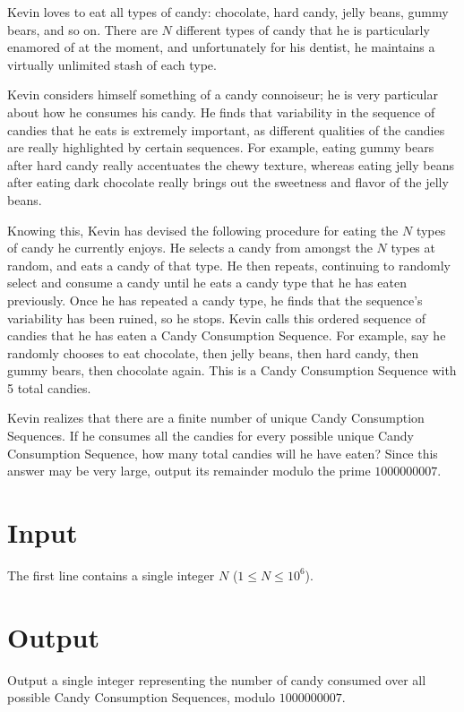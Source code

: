 
Kevin loves to eat all types of candy: chocolate, hard candy, jelly beans, gummy bears, and so on.
There are $N$ different types of candy that he is particularly enamored of at the moment, and unfortunately
for his dentist, he maintains a virtually unlimited stash of each type.

Kevin considers himself something of a candy connoiseur; he is very particular about how he consumes his
candy. He finds that variability in the sequence of candies that he eats is extremely important, as
different qualities of the candies are really highlighted by certain sequences. For example, eating gummy
bears after hard candy really accentuates the chewy texture, whereas eating jelly beans after eating dark
chocolate really brings out the sweetness and flavor of the jelly beans.

Knowing this, Kevin has devised the
following procedure for eating the $N$ types of candy he currently enjoys. He selects a candy from amongst
the $N$ types at random, and eats a candy of that type. He then repeats, continuing to randomly select and
consume a candy until he eats a candy type that he has eaten previously. Once he has repeated a candy
type, he finds that the sequence's variability has been ruined, so he stops. Kevin calls this ordered
sequence of candies that he has eaten a Candy Consumption Sequence. For example, say he randomly chooses
to eat chocolate, then jelly beans, then hard candy, then gummy bears, then chocolate again. This is a
Candy Consumption Sequence with 5 total candies.

Kevin realizes that there are a finite number of unique Candy Consumption Sequences. If he consumes all the
candies for every possible unique Candy Consumption Sequence, how many total candies will he have eaten? 
Since this answer may be very large, output its remainder modulo the prime $1000000007$.

\section*{Input}
The first line contains a single integer $N$ ($1 \leq N \leq 10^6$).

\section*{Output}
Output a single integer representing the number of candy consumed over all possible Candy Consumption
Sequences, modulo $1000000007$.
